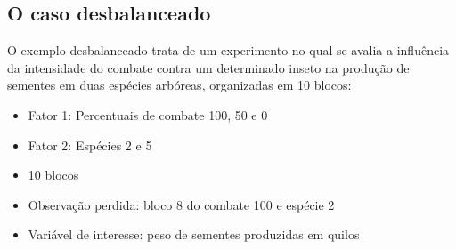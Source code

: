 \documentclass[
]{article}
\providecommand{\tightlist}{%
  \setlength{\itemsep}{0pt}\setlength{\parskip}{0pt}}
\begin{document}
\hypertarget{o-caso-desbalanceado-3}{%
\subsection{O caso desbalanceado}\label{o-caso-desbalanceado-3}}

O exemplo desbalanceado trata de um experimento no qual se avalia a influência da intensidade do combate contra um determinado inseto na produção de sementes em duas espécies arbóreas, organizadas em 10 blocos:

\begin{itemize}
\tightlist
\item
  Fator 1: Percentuais de combate 100, 50 e 0
\item
  Fator 2: Espécies 2 e 5
\item
  10 blocos
\item
  Observação perdida: bloco 8 do combate 100 e espécie 2
\item
  Variável de interesse: peso de sementes produzidas em quilos
\end{itemize}
\end{document}
